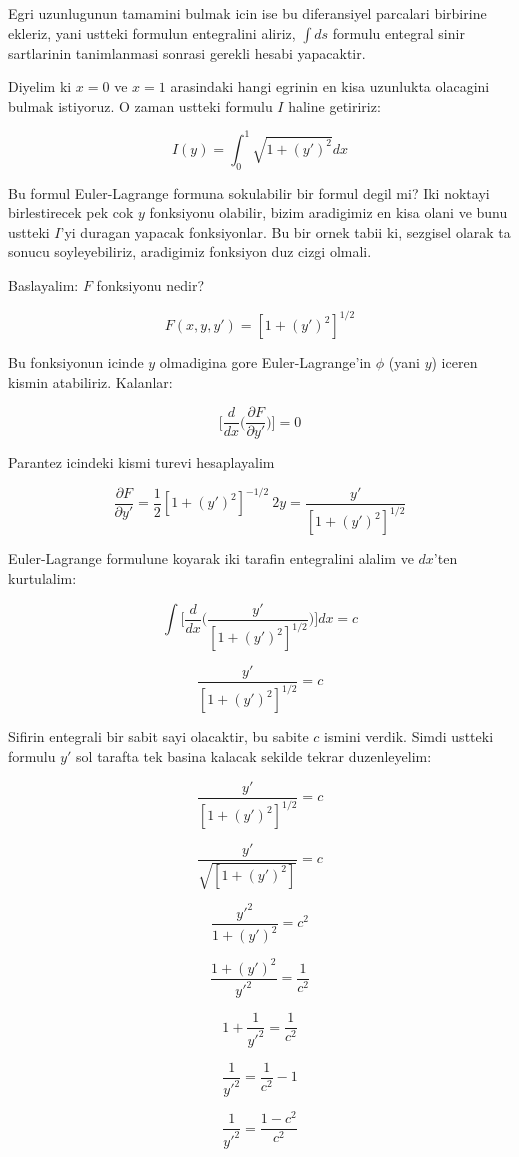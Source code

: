 \documentclass[12pt,fleqn]{article}
\begin{document}
Egri uzunlugunun tamamini bulmak icin ise bu diferansiyel parcalari birbirine
ekleriz, yani ustteki formulun entegralini aliriz, $\int ds$ formulu entegral
sinir sartlarinin tanimlanmasi sonrasi gerekli hesabi yapacaktir.

Diyelim ki $x=0$ ve $x=1$ arasindaki hangi egrinin en kisa uzunlukta olacagini
bulmak istiyoruz. O zaman ustteki formulu $I$ haline getiririz:

\[ I(y) = \int_0^1 \sqrt{1 + (y')^2} dx \]

Bu formul Euler-Lagrange formuna sokulabilir bir formul degil mi? Iki noktayi
birlestirecek pek cok $y$ fonksiyonu olabilir, bizim aradigimiz en kisa olani ve
bunu ustteki $I$'yi duragan yapacak fonksiyonlar. Bu bir ornek tabii ki,
sezgisel olarak ta sonucu soyleyebiliriz, aradigimiz fonksiyon duz cizgi
olmali. 

Baslayalim: $F$ fonksiyonu nedir?

\[ F(x,y,y') = [1+(y')^2]^{1/2} \]

Bu fonksiyonun icinde $y$ olmadigina gore Euler-Lagrange'in $\phi$ (yani $y$)
iceren kismin atabiliriz. Kalanlar:

\[ 
\bigg[
\frac{d}{dx} \bigg( \frac{\partial F}{\partial y'} \bigg)
\bigg] = 0
 \]

Parantez icindeki kismi turevi hesaplayalim

\[ \frac{\partial F}{\partial y'} = \frac{1}{2}[1+(y')^2]^{-1/2}\ 2y = \frac{y'}{[1+(y')^2]^{1/2}} \]

Euler-Lagrange formulune koyarak iki tarafin entegralini alalim ve $dx$'ten
kurtulalim:

\[ 
\int \bigg[
\frac{d}{dx} \bigg( \frac{y'}{[1+(y')^2]^{1/2}} \bigg)
\bigg]dx = c 
 \]

\[ \frac{y'}{[1+(y')^2]^{1/2}}  = c \]

Sifirin entegrali bir sabit sayi olacaktir, bu sabite $c$ ismini verdik. Simdi
ustteki formulu $y'$ sol tarafta tek basina kalacak sekilde tekrar duzenleyelim:

\[ \frac{y'}{[1+(y')^2]^{1/2}}  = c  \]

\[ \frac{y'}{\sqrt{[1+(y')^2]}}  = c  \]

\[ \frac{y'^2}{1+(y')^2}  = c^2 \]

\[ \frac{1+(y')^2}{y'^2}  = \frac{1}{c^2} \]

\[ 1+\frac{1}{y'^2} = \frac{1}{c^2}  \]

\[ \frac{1}{y'^2} = \frac{1}{c^2} - 1 \]

\[ \frac{1}{y'^2} = \frac{1-c^2}{c^2}  \]
\end{document}
